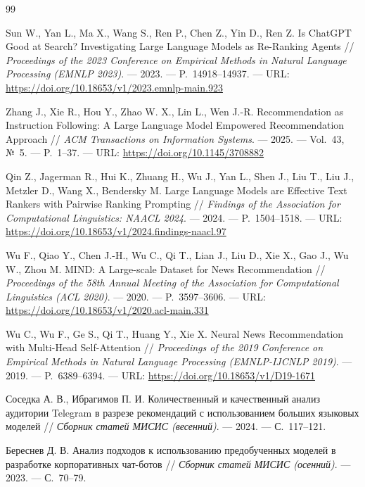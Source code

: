 \documentclass{misisarticle}
\begin{document}
\begin{thebibliography}{99}

 Sun W., Yan L., Ma X., Wang S., Ren P., Chen Z., Yin D., Ren Z. Is ChatGPT Good at Search? Investigating Large Language Models as Re-Ranking Agents // \textit{Proceedings of the 2023 Conference on Empirical Methods in Natural Language Processing (EMNLP 2023)}. — 2023. — P.~14918–14937. — URL: \url{https://doi.org/10.18653/v1/2023.emnlp-main.923}

 Zhang J., Xie R., Hou Y., Zhao W. X., Lin L., Wen J.-R. Recommendation as Instruction Following: A Large Language Model Empowered Recommendation Approach // \textit{ACM Transactions on Information Systems}. — 2025. — Vol.~43, №~5. — P.~1–37. — URL: \url{https://doi.org/10.1145/3708882}

 Qin Z., Jagerman R., Hui K., Zhuang H., Wu J., Yan L., Shen J., Liu T., Liu J., Metzler D., Wang X., Bendersky M. Large Language Models are Effective Text Rankers with Pairwise Ranking Prompting // \textit{Findings of the Association for Computational Linguistics: NAACL 2024}. — 2024. — P.~1504–1518. — URL: \url{https://doi.org/10.18653/v1/2024.findings-naacl.97}

 Wu F., Qiao Y., Chen J.-H., Wu C., Qi T., Lian J., Liu D., Xie X., Gao J., Wu W., Zhou M. MIND: A Large-scale Dataset for News Recommendation // \textit{Proceedings of the 58th Annual Meeting of the Association for Computational Linguistics (ACL 2020)}. — 2020. — P.~3597–3606. — URL: \url{https://doi.org/10.18653/v1/2020.acl-main.331}

 Wu C., Wu F., Ge S., Qi T., Huang Y., Xie X. Neural News Recommendation with Multi-Head Self-Attention // \textit{Proceedings of the 2019 Conference on Empirical Methods in Natural Language Processing (EMNLP-IJCNLP 2019)}. — 2019. — P.~6389–6394. — URL: \url{https://doi.org/10.18653/v1/D19-1671}

 Соседка А. В., Ибрагимов П. И. Количественный и качественный анализ аудитории Telegram в разрезе рекомендаций с использованием больших языковых моделей // \textit{Сборник статей МИСИС (весенний)}. — 2024. — С.~117–121.

 Береснев Д. В. Анализ подходов к использованию предобученных моделей в разработке корпоративных чат-ботов // \textit{Сборник статей МИСИС (осенний)}. — 2023. — С.~70–79.

\end{thebibliography}
\end{document}
